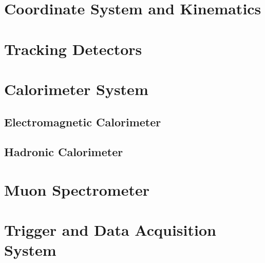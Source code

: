 \section{Coordinate System and Kinematics}
\section{Tracking Detectors}
\section{Calorimeter System}
\subsection{Electromagnetic Calorimeter}
\subsection{Hadronic Calorimeter}
\section{Muon Spectrometer}
\section{Trigger and Data Acquisition System} 

